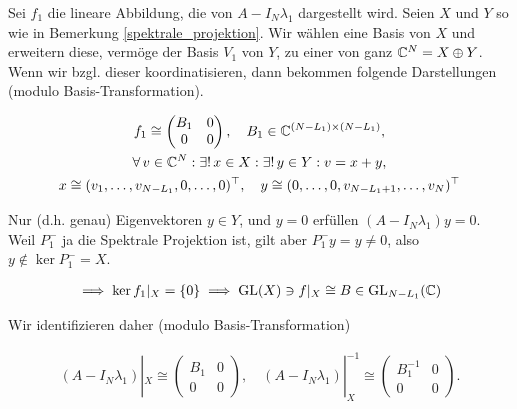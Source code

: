 \begin{remark} \label{semi_inverse}

    Sei $f_1$ die lineare Abbildung, die von $A - I_N \lambda_1$ dargestellt wird.
    Seien $X$ und $Y$ so wie in Bemerkung \ref{spektrale_projektion}.
    Wir wählen eine Basis von $X$ und erweitern diese, vermöge der Basis $V_1$ von $Y$, zu einer von ganz $\mathbb{C}^N = X \oplus Y$.
    Wenn wir bzgl. dieser koordinatisieren, dann bekommen folgende Darstellungen (modulo Basis-Transformation).

    \begin{gather*}
        f_1
        \cong
        \begin{pmatrix}
            B_1 & 0 \\
            0   & 0
        \end{pmatrix},
        \quad
        B_1 \in \mathbb{C}^{(N - L_1) \times (N - L_1)}, \\
        \forall \, v \in \mathbb{C}^N:
            \exists! \, x \in X:
            \exists! \, y \in Y:
                v = x + y, \\
        x
        \cong
        (
            v_1, \dots, v_{N - L_1},
            0, \dots, 0
        )^\top,
        \quad
        y
        \cong
        (
            0, \dots, 0,
            v_{N - L_1 + 1}, \dots, v_N
        )^\top
    \end{gather*}

    Nur (d.h. genau) Eigenvektoren $y \in Y$, und $y = 0$ erfüllen $(A - I_N \lambda_1) y = 0$.
    Weil $P_1^-$ ja die Spektrale Projektion ist, gilt aber $P_1^- y = y \neq 0$, also $y \not \in \ker P_1^- = X$.

    \begin{align*}
        \implies
        \ker f_1 |_X = {\left \{ 0 \right \}}
        \implies
        \operatorname{GL}(X) \ni f |_X \cong B \in \operatorname{GL}_{N - L_1}(\mathbb{C})
    \end{align*}

    Wir identifizieren daher (modulo Basis-Transformation)

    \begin{align*}
        (A - I_N \lambda_1) |_X
        \cong
        \begin{pmatrix}
            B_1 & 0 \\ 0 & 0
        \end{pmatrix},
        \quad
        (A - I_N \lambda_1) |_X^{-1}
        \cong
        \begin{pmatrix}
            B_1^{-1} & 0 \\ 0 & 0
        \end{pmatrix}.
    \end{align*}

\end{remark}